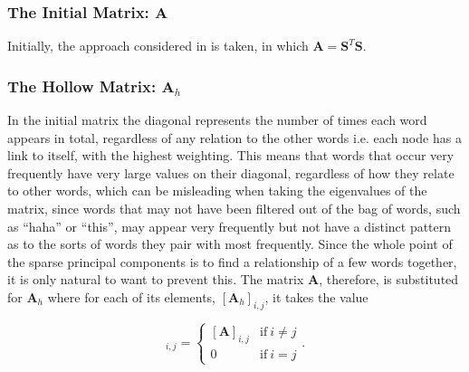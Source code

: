 \documentclass[graybox]{svmult}
\begin{document}
\subsubsection{The Initial Matrix: $\mathbf{A}$}
Initially, the approach considered in \cite{dimakis} is taken, in which $\mathbf{A} = \mathbf{S}^T \mathbf{S}$.


  
\subsubsection{The Hollow Matrix: $\mathbf{A}_{h}$}

In the initial matrix the diagonal represents the number of times each word appears in total, regardless of any relation to the other words i.e. each node has a link to itself, with the highest weighting. This means that words that occur very frequently have very large values on their diagonal, regardless of how they relate to other words, which can be misleading when taking the eigenvalues of the matrix, since words that may not have been filtered out of the bag of words, such as ``haha'' or ``this'', may appear very frequently but not have a distinct pattern as to the sorts of words they pair with most frequently. Since the whole point of the sparse principal components is to find a relationship of a few words together, it is only natural to want to prevent this. The matrix $\mathbf{A}$, therefore, is substituted for 
$\mathbf{A}_h$ where for each of its elements, $[\mathbf{A}_h]_{i, j}$, it takes the value 

\begin{equation}
[\mathbf{A}_h]_{i, j}= 
\begin{cases}
[\mathbf{A}]_{i, j} & \text{if}\ i \neq j\\
0 & \text{if}\ i = j
\end{cases}.
\end{equation}
\begin{comment}
In this case, the second sparse PC once again does not represent any significant occasion and seems to just be a few words that may occur frequently together or separately. Contrary to the previous case though, the first sparse PC refers to a very specific event regarding a murder that took place on the 19th September 2012, where 2 police officers were killed and which resulted in a trending topic on Twitter. 

What is useful to note is that in the case of the first PC 7 of the 8 words rank much lower than the top 20 words, the lowest one occurring merely 34 times and the highest appearing 485 times, which is comparable to the lowest in the previous case. This clearly highlights the positive effect of removing the link of the each vertex to itself, which allows the algorithm to discover relationships which would otherwise be completely overpowered. 

\end{comment}
\end{document}
